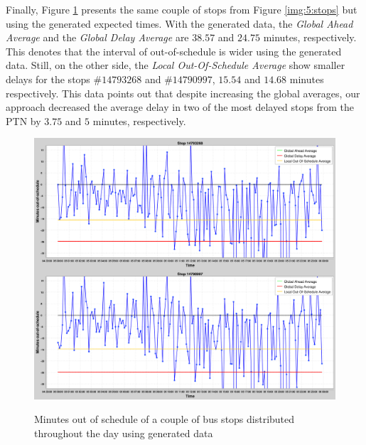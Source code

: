 Finally, Figure \ref{img:5:stops_generated} presents the same couple of stops from Figure \ref{img:5:stops} but using the
generated expected times. With the generated data, the \textit{Global Ahead Average} and the \textit{Global Delay Average}
are $38.57$ and $24.75$ minutes, respectively. This denotes that the interval of out-of-schedule is wider using the generated data. Still, on the other side, the \textit{Local Out-Of-Schedule Average} show smaller delays for the stops $\#14793268$ and $\#14790997$, $15.54$ and $14.68$ minutes respectively. This data points out that despite increasing the global averages, our 
approach decreased the average delay in two of the most delayed stops from the PTN by $3.75$ and $5$ minutes, respectively.

\begin{figure}[h]
     \centering
        \caption{Minutes out of schedule of a couple of bus stops distributed throughout the day using generated data}
        \includegraphics[width=\textwidth]{imagem/cap5/stops2_generated.png}
        \label{img:5:stops_generated}
\end{figure}

